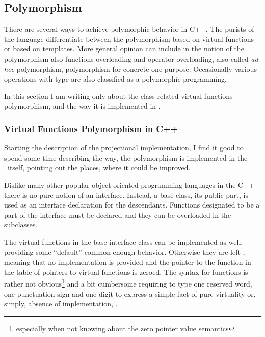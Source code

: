 \subsection{Polymorphism}

There are several ways to achieve polymorphic behavior in C++. The purists of the language differentiate 
between the polymorphism based on virtual functions or based on templates. More general opinion can include
in the notion of the polymorphism also functions overloading and operator overloading, also called 
\emph{ad hoc} polymorphism, polymorphism for concrete one purpose. 
Occasionally various operations with  type are also classified as a polymorphic programming.

In this section I am writing only about the class-related virtual functions polymorphism, and the way it is 
implemented in \pcpp.

\subsubsection{Virtual Functions Polymorphism in C++}
\label{cpppolydefs}

Starting the description of the projectional implementation, I find it good to spend some time describing
the way, the polymorphism is implemented in the \cpppl\ itself, pointing out the places, where it could be improved.

Dislike many other popular object-oriented programming languages in the C++ there is no pure notion of
an interface. Instead, a base class, its public part, is used as an interface declaration for the descendants. 
Functions designated to be a part of the interface must be declared  and they can be overloaded in
the subclasses.

The virtual functions in the base-interface class can be implemented as well, providing some ``default''
common enough behavior. Otherwise they are left , meaning that no implementation is provided
and the pointer to the function in the table of pointers to virtual functions is zeroed. The syntax
for  functions is rather not obvious\footnote{especially when not knowing about the zero pointer value semantics}
and a bit cumbersome requiring to type one reserved word, one punctuation sign and one digit to 
express a simple fact of pure virtuality or, simply, absence of implementation, .


